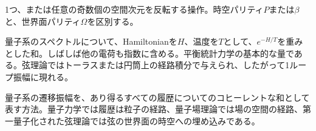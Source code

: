 {1つ、または任意の奇数個の空間次元を反転する操作。時空パリティ$P$または$\beta$と、世界面パリティ$\Omega$を区別する。}

{量子系のスペクトルについて、Hamiltonianを$H$、温度を$T$として、$e^{-H/T}$を重みとした和。しばしば他の電荷も指数に含める。平衡統計力学の基本的な量である。弦理論ではトーラスまたは円筒上の経路積分で与えられ、したがって1ループ振幅に現れる。}

{量子系の遷移振幅を、あり得るすべての履歴についてのコヒーレントな和として表す方法。量子力学では履歴は粒子の経路、量子場理論では場の空間の経路、第一量子化された弦理論では弦の世界面の時空への埋め込みである。}
